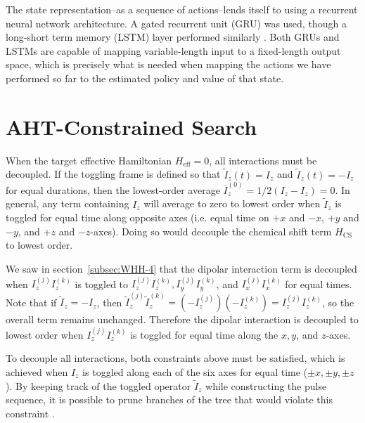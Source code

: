 The state representation--as a sequence of actions--lends itself to using a recurrent neural network architecture. A gated recurrent unit (GRU) was used, though a long-short term memory (LSTM) layer performed similarly \cite{cho2014learning, lstm}.
Both GRUs and LSTMs are capable of mapping variable-length input to a fixed-length output space, which is precisely what is needed when mapping the actions we have performed so far to the estimated policy and value of that state.


\section{AHT-Constrained Search}\label{sec:AHT-constraints}


When the target effective Hamiltonian $H_\text{eff} = 0$, all interactions must be decoupled. If the toggling frame is defined so that $\widetilde{I}_z(t) = I_z$ and $\widetilde{I}_z(t) = -I_z$ for equal durations, then the lowest-order average $\overline{I}_z^{(0)} = 1/2(I_z - I_z) = 0$. In general, any term containing $I_z$ will average to zero to lowest order when $\widetilde{I}_z$ is toggled for equal time along opposite axes (i.e. equal time on $+x$ and $-x$, $+y$ and $-y$, and $+z$ and $-z$-axes).
Doing so would decouple the chemical shift term $H_\text{CS}$ to lowest order.

We saw in section~\ref{subsec:WHH-4} that the dipolar interaction term is decoupled when $I_z^{(j)}I_z^{(k)}$ is toggled to $I_z^{(j)}I_z^{(k)}, I_y^{(j)}I_y^{(k)}$, and $I_x^{(j)}I_x^{(k)}$ for equal times.
Note that if $\widetilde{I}_z = -I_z$, then $\widetilde{I}_z^{(j)}\widetilde{I}_z^{(k)} = (-I_z^{(j)})(-I_z^{(k)}) = I_z^{(j)}I_z^{(k)}$, so the overall term remains unchanged.
Therefore the dipolar interaction is decoupled to lowest order when $I_z^{(j)}I_z^{(k)}$ is toggled for equal time along the $x, y$, and $z$-axes.

To decouple all interactions, both constraints above must be satisfied, which is achieved when $I_z$ is toggled along each of the six axes for equal time ($\pm x, \pm y, \pm z$). By keeping track of the toggled operator $\widetilde{I}_z$ while constructing the pulse sequence, it is possible to prune branches of the tree that would violate this constraint%
.

